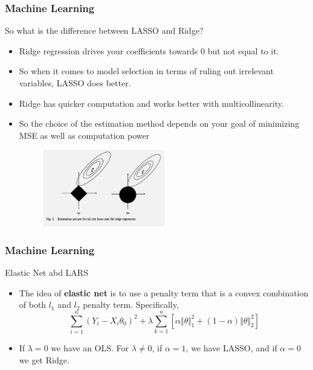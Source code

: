 \documentclass{beamer}
\begin{document}
\begin{frame}
\frametitle{Machine Learning}
So what is the difference between LASSO and Ridge? 
\begin{itemize}
\item Ridge regression drives your coefficients towards 0 but not equal to it.
\item So when it comes to model selection in terms of ruling out irrelevant variables, LASSO does better. 
\item Ridge has quicker computation and works better with multicollinearity.  
\item So the choice of the estimation method depends on your goal of minimizing MSE as well as computation power
\begin{figure}[H]
\centering
\includegraphics[width=0.5\textwidth, keepaspectratio]{lasso.png}
\end{figure}
\end{itemize}
\end{frame}

\begin{frame}
\frametitle{Machine Learning}
Elastic Net abd LARS
\begin{itemize}
\item The idea of \textbf{elastic net} is to use a penalty term that is a convex combination of both $l_1$ and $l_2$ penalty term. Specifically, 
\[
\sum_{i=1}^n(Y_i-X_i\theta_0)^2+\lambda\sum_{k=1}^n\left[\alpha \Vert \theta \Vert_1^2 +(1-\alpha)\Vert \theta \Vert_2^2\right]
\]
\item If $\lambda=0$ we have an OLS. For $\lambda\neq0$, if $\alpha=1$, we have LASSO, and if $\alpha=0$ we get Ridge. 
\end{itemize}
\end{frame}
\end{document}
